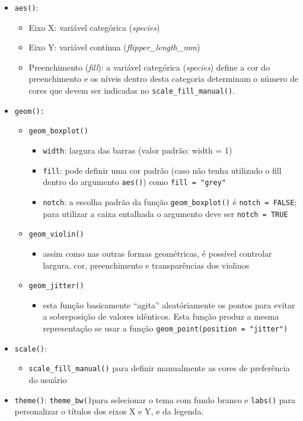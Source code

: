 \documentclass[
]{book}
\providecommand{\tightlist}{%
  \setlength{\itemsep}{0pt}\setlength{\parskip}{0pt}}
\begin{document}
\begin{itemize}
\item
  \texttt{aes()}:

  \begin{itemize}
  \item
    Eixo X: variável categórica (\emph{species})
  \item
    Eixo Y: variável contínua (\emph{flipper\_length\_mm})
  \item
    Preenchimento (\emph{fill}): a variável categórica (\emph{species}) define a cor do preenchimento e os níveis dentro desta categoria determinam o número de cores que devem ser indicadas no \texttt{scale\_fill\_manual()}.
  \end{itemize}
\item
  \texttt{geom():}

  \begin{itemize}
  \item
    \texttt{geom\_boxplot()}

    \begin{itemize}
    \item
      \texttt{width}: largura das barras (valor padrão: width = 1)
    \item
      \texttt{fill}: pode definir uma cor padrão (caso não tenha utilizado o fill dentro do argumento \texttt{aes()}) como \texttt{fill\ =\ "grey"}
    \item
      \texttt{notch}: a escolha padrão da função \texttt{geom\_boxplot()} é \texttt{notch\ =\ FALSE}; para utilizar a caixa entalhada o argumento deve ser \texttt{notch\ =\ TRUE}
    \end{itemize}
  \item
    \texttt{geom\_violin()}

    \begin{itemize}
    \tightlist
    \item
      assim como nas outras formas geométricas, é possível controlar largura, cor, preenchimento e transparências dos violinos
    \end{itemize}
  \item
    \texttt{geom\_jitter()}

    \begin{itemize}
    \tightlist
    \item
      esta função basicamente ``agita'' aleatóriamente os pontos para evitar a sobreposição de valores idênticos. Esta função produz a mesma representação se usar a função \texttt{geom\_point(position\ =\ "jitter")}
    \end{itemize}
  \end{itemize}
\item
  \texttt{scale()}:

  \begin{itemize}
  \tightlist
  \item
    \texttt{scale\_fill\_manual()} para definir manualmente as cores de preferência do usuário
  \end{itemize}
\item
  \texttt{theme()}: \texttt{theme\_bw()}para selecionar o tema com fundo branco e \texttt{labs()} para personalizar o títulos dos eixos X e Y, e da legenda.
\end{itemize}
\end{document}
